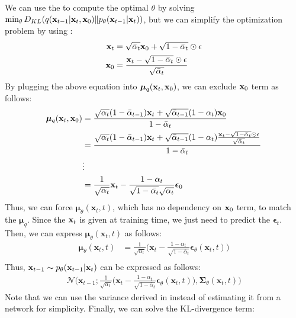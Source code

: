 We can use the  to compute the optimal $\theta$ by solving $\min_\theta D_{KL}(q({\mathbf{x}}_{t-1}|{\mathbf{x}}_t, {\mathbf{x}}_0)\|p_\theta({\mathbf{x}}_{t-1}|{\mathbf{x}}_{t}))$, but we can simplify the optimization problem by using :
\begin{align*}
	{\mathbf{x}}_t &= \sqrt{\bar{\alpha}_t} \mathbf{x}_{0}+ \sqrt{1-\bar{\alpha}_t} \odot \epsilon\\
	\mathbf{x}_{0} &= \frac{{\mathbf{x}}_t - \sqrt{1-\bar{\alpha}_t}\odot \epsilon}{\sqrt{\bar{\alpha}_t} } 
\end{align*}
By plugging the above equation into $\boldsymbol{\mu}_q({\mathbf{x}}_t,{\mathbf{x}}_0)$, we can exclude ${\mathbf{x}}_0$ term as follows:
\begin{align}
	\boldsymbol{\mu}_q({\mathbf{x}}_t,{\mathbf{x}}_0) &= \frac{\sqrt{{\alpha}_{t}}(1-\bar{\alpha}_{t-1}){\mathbf{x}}_t+\sqrt{\bar{\alpha}_{t-1}}(1-{\alpha}_{t}){\mathbf{x}}_0}{1-\bar{\alpha}_{t}}\\
									  &= \frac{\sqrt{{\alpha}_{t}}(1-\bar{\alpha}_{t-1}){\mathbf{x}}_t+\sqrt{\bar{\alpha}_{t-1}}(1-{\alpha}_{t})\frac{{\mathbf{x}}_t - \sqrt{1-\bar{\alpha}_t}\odot \epsilon}{\sqrt{\bar{\alpha}_t} }}{1-\bar{\alpha}_{t}}\\
									  &\vdots\\
									  &= \frac{1}{\sqrt{\alpha_t}}{\mathbf{x}}_t - \frac{1-\alpha_t}{\sqrt{1-\bar{\alpha_t}}\sqrt{\alpha_t}}\boldsymbol{\epsilon}_0
	\label{eq:diffusion_mean_simple}
\end{align}
Thus, we can force $\boldsymbol{\mu}_\theta(\mathbf{x}_t, t)$, which has no dependency on ${\mathbf{x}}_0$ term, to match the $\boldsymbol{\mu}_q$. Since the ${\mathbf{x}}_t$ is given at training time, we just need to predict the $\boldsymbol{\epsilon}_t$. Then, we can express $\boldsymbol{\mu}_\theta(\mathbf{x}_t, t)$ as follows:
\begin{align*}
\boldsymbol{\mu}_\theta(\mathbf{x}_t, t) &= \frac{1}{\sqrt{\alpha_t}} \bigg( \mathbf{x}_t - \frac{1 - \alpha_t}{\sqrt{1 - \bar{\alpha}_t}} \boldsymbol{\epsilon}_\theta(\mathbf{x}_t, t) \bigg) \\
\end{align*}
Thus, ${\mathbf{x}}_{t-1}\sim p_\theta(\mathbf{x}_{t-1} \vert \mathbf{x}_t)$ can be expressed as follows:
\begin{align*}
	\mathcal{N}\Bigg(\mathbf{x}_{t-1}; \frac{1}{\sqrt{\alpha_t}} \bigg( \mathbf{x}_t - \frac{1 - \alpha_t}{\sqrt{1 - \bar{\alpha}_t}} \boldsymbol{\epsilon}_\theta(\mathbf{x}_t, t) \bigg), \boldsymbol{\Sigma}_\theta(\mathbf{x}_t, t)\Bigg)
\end{align*}
Note that we can use the variance derived in  instead of estimating it from a network for simplicity. Finally, we can solve the KL-divergence term:

